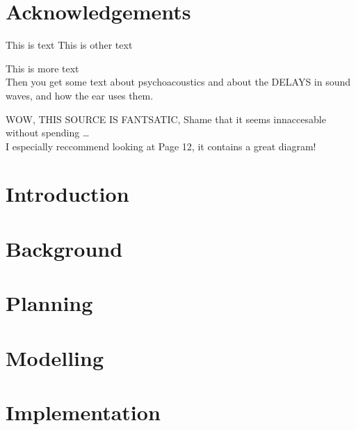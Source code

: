\documentclass[a4paper, 12pt]{report}
\begin{document}


\abstract{}
\setcounter{page}{2}

\tableofcontents
{}

\listoffigures
{}

\listoftables
{}

\chapter*{Acknowledgements}


This is text \cite{EMHeadsets}
This is other text \cite{EMNoiseCancel}

This is more \cite{ICAAlg&Apps} text\\
Then you get some text about psychoacoustics \cite{MusCogCompSou} and about the DELAYS in sound waves, and how the ear uses them.

WOW, THIS SOURCE\cite{AdvancedDSPing} IS FANTSATIC, Shame that it seems innaccesable without spending \ldots \\
I especially reccommend looking at Page 12, it contains a great diagram!

\chapter{Introduction}

\chapter{Background}

\chapter{Planning}

\chapter{Modelling}



\chapter{Implementation}
\end{document}
